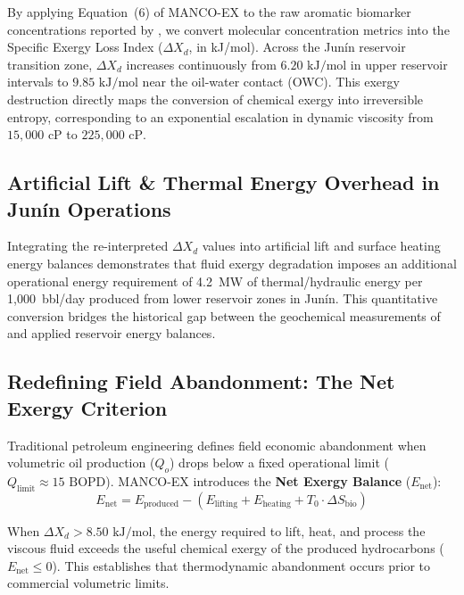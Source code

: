 \documentclass[review,12pt]{elsarticle}
\begin{document}
By applying Equation~(6) of MANCO-EX to the raw aromatic biomarker concentrations reported by \citet{lopez2014biodegradation}, we convert molecular concentration metrics into the Specific Exergy Loss Index ($\Delta X_d$, in kJ/mol). Across the Junín reservoir transition zone, $\Delta X_d$ increases continuously from $6.20\text{ kJ/mol}$ in upper reservoir intervals to $9.85\text{ kJ/mol}$ near the oil-water contact (OWC). This exergy destruction directly maps the conversion of chemical exergy into irreversible entropy, corresponding to an exponential escalation in dynamic viscosity from $15,000\text{ cP}$ to $225,000\text{ cP}$.

\subsection{Artificial Lift \& Thermal Energy Overhead in Junín Operations}
Integrating the re-interpreted $\Delta X_d$ values into artificial lift and surface heating energy balances demonstrates that fluid exergy degradation imposes an additional operational energy requirement of 4.2~MW of thermal/hydraulic energy per 1,000~bbl/day produced from lower reservoir zones in Junín. This quantitative conversion bridges the historical gap between the geochemical measurements of \citet{lopez2014biodegradation} and applied reservoir energy balances.

\subsection{Redefining Field Abandonment: The Net Exergy Criterion}
Traditional petroleum engineering defines field economic abandonment when volumetric oil production ($Q_o$) drops below a fixed operational limit ($Q_{\text{limit}} \approx 15\text{ BOPD}$). MANCO-EX introduces the \textbf{Net Exergy Balance} ($E_{\text{net}}$):
\begin{equation}
    E_{\text{net}} = E_{\text{produced}} - \left( E_{\text{lifting}} + E_{\text{heating}} + T_0 \cdot \Delta S_{\text{bio}} \right)
\end{equation}

When $\Delta X_d > 8.50\text{ kJ/mol}$, the energy required to lift, heat, and process the viscous fluid exceeds the useful chemical exergy of the produced hydrocarbons ($E_{\text{net}} \le 0$). This establishes that thermodynamic abandonment occurs prior to commercial volumetric limits.
\end{document}
